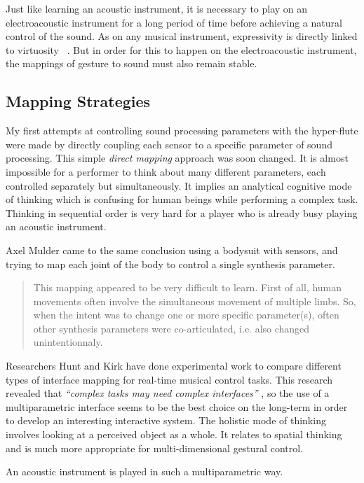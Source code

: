 Just like learning an acoustic instrument, it is necessary to play on an electroacoustic instrument for a long period of time before achieving a natural control of the sound. As on any musical instrument, expressivity is directly linked to virtuosity~ \cite{Dobrian:2006}. But in order for this to happen on the electroacoustic instrument, the mappings of gesture to sound must also remain stable.


\subsection{Mapping Strategies}

My first attempts at controlling sound processing parameters with the hyper-flute were made by directly coupling each sensor to a specific parameter of sound processing. This simple \emph{direct mapping} approach was soon changed. It is almost impossible for a performer to think about many different parameters, each controlled separately but simultaneously. It implies an analytical cognitive mode of thinking which is confusing for human beings while performing a complex task. Thinking in sequential order is very hard for a player who is already busy playing an acoustic instrument. 

Axel Mulder came to the same conclusion using a bodysuit with sensors, and trying to map each joint of the body to control a single synthesis parameter. 

\begin{quotation}
This mapping appeared to be very difficult to learn. First of all, human movements often involve the simultaneous movement of multiple limbs. So, when the intent was to change one or more specific parameter(s), often other synthesis parameters were co-articulated, i.e. also changed unintentionnaly. \cite[p.325]{Mulder:2000}
\end{quotation}


Researchers Hunt and Kirk have done experimental work to compare different types of interface mapping for real-time musical control tasks. This research revealed that  \emph{``complex tasks may need complex interfaces''} \cite[p.254]{Hunt:2000}, so the use of a multiparametric interface seems to be the best choice on the long-term in order to develop an interesting interactive system. The holistic mode of thinking involves looking at a perceived object as a whole. It relates to spatial thinking and is much more appropriate for multi-dimensional gestural control. 

An acoustic instrument is played in such a multiparametric way. 

